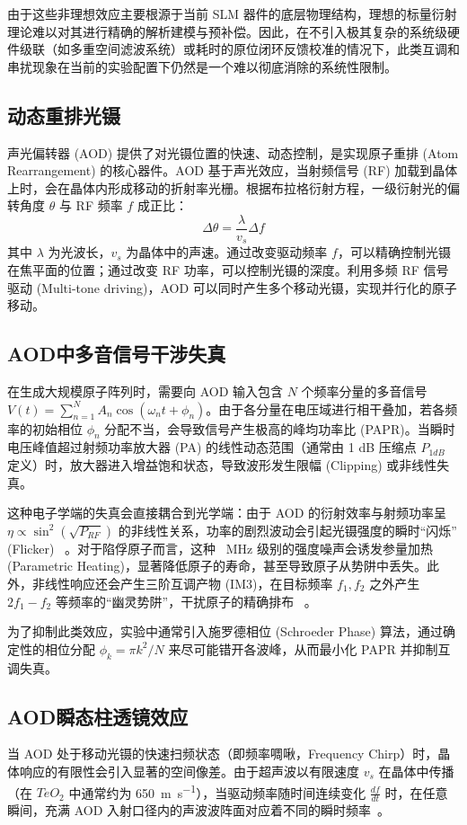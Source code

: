 \documentclass[../main.tex]{subfiles}
\begin{document}
由于这些非理想效应主要根源于当前 SLM 器件的底层物理结构，理想的标量衍射理论难以对其进行精确的解析建模与预补偿。因此，在不引入极其复杂的系统级硬件级联（如多重空间滤波系统）或耗时的原位闭环反馈校准的情况下，此类互调和串扰现象在当前的实验配置下仍然是一个难以彻底消除的系统性限制。

\subsection{动态重排光镊}
声光偏转器 (AOD) 提供了对光镊位置的快速、动态控制，是实现原子重排 (Atom Rearrangement) 的核心器件。AOD 基于声光效应，当射频信号 (RF) 加载到晶体上时，会在晶体内形成移动的折射率光栅。根据布拉格衍射方程，一级衍射光的偏转角度 $\theta$ 与 RF 频率 $f$ 成正比：
\begin{equation}
\Delta \theta = \frac{\lambda}{v_s} \Delta f
\end{equation}
其中 $\lambda$ 为光波长，$v_s$ 为晶体中的声速。通过改变驱动频率 $f$，可以精确控制光镊在焦平面的位置；通过改变 RF 功率，可以控制光镊的深度。利用多频 RF 信号驱动 (Multi-tone driving)，AOD 可以同时产生多个移动光镊，实现并行化的原子移动。

\subsection{AOD中多音信号干涉失真}
在生成大规模原子阵列时，需要向 AOD 输入包含 $N$ 个频率分量的多音信号 $V(t) = \sum_{n=1}^{N} A_n \cos(\omega_n t + \phi_n)$。由于各分量在电压域进行相干叠加，若各频率的初始相位 $\phi_n$ 分配不当，会导致信号产生极高的峰均功率比 (PAPR)。当瞬时电压峰值超过射频功率放大器 (PA) 的线性动态范围（通常由 1 dB 压缩点 $P_{1dB}$ 定义）时，放大器进入增益饱和状态，导致波形发生限幅 (Clipping) 或非线性失真。

这种电子学端的失真会直接耦合到光学端：由于 AOD 的衍射效率与射频功率呈 $\eta \propto \sin^2(\sqrt{P_{RF}})$ 的非线性关系，功率的剧烈波动会引起光镊强度的瞬时“闪烁” (Flicker) ~\cite{endres2016atom}。对于陷俘原子而言，这种 \SI{}{\MHz} 级别的强度噪声会诱发参量加热 (Parametric Heating)，显著降低原子的寿命，甚至导致原子从势阱中丢失。此外，非线性响应还会产生三阶互调产物 (IM3)，在目标频率 $f_1, f_2$ 之外产生 $2f_1-f_2$ 等频率的“幽灵势阱”，干扰原子的精确排布 ~\cite{lu2025astigmatism}。

为了抑制此类效应，实验中通常引入施罗德相位 (Schroeder Phase) 算法，通过确定性的相位分配 $\phi_k = \pi k^2 / N$ 来尽可能错开各波峰，从而最小化 PAPR 并抑制互调失真。

\subsection{AOD瞬态柱透镜效应}
当 AOD 处于移动光镊的快速扫频状态（即频率啁啾，Frequency Chirp）时，晶体响应的有限性会引入显著的空间像差。由于超声波以有限速度 $v_s$ 在晶体中传播（在 $TeO_2$ 中通常约为 \SI{650}{\m\per\s}），当驱动频率随时间连续变化 $\frac{df}{dt}$ 时，在任意瞬间，充满 AOD 入射口径内的声波波阵面对应着不同的瞬时频率~\cite{guo2025acousto}。
\end{document}
